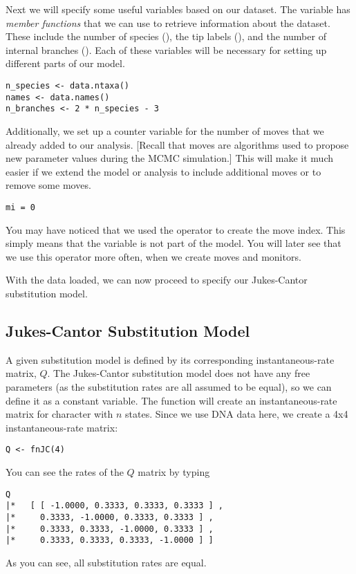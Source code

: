 Next we will specify some useful variables based on our dataset. The variable  has \textit{member functions} that we can use to retrieve information about the dataset. 
These include the number of species (), the tip labels (), and the number of internal branches ().
Each of these variables will be necessary for setting up different parts of our model.
{\tt \begin{snugshade*}
\begin{lstlisting}
n_species <- data.ntaxa()
names <- data.names()	
n_branches <- 2 * n_species - 3 
\end{lstlisting}
\end{snugshade*}}

Additionally, we set up a counter variable for the number of moves that we already added to our analysis.
[Recall that moves are algorithms used to propose new parameter values during the MCMC simulation.]
This will make it much easier if we extend the model or analysis to include additional moves or to remove some moves.
{\tt \begin{snugshade*}
\begin{lstlisting}
mi = 0 
\end{lstlisting}
\end{snugshade*}}
You may have noticed that we used the \cl{=} operator to create the move index.
This simply means that the variable is not part of the model.
You will later see that we use this operator more often, \EG when we create moves and monitors.

With the data loaded, we can now proceed to specify our Jukes-Cantor substitution model.

\subsection{Jukes-Cantor Substitution Model}

A given substitution model is defined by its corresponding instantaneous-rate matrix, $Q$.
The Jukes-Cantor substitution model does not have any free parameters (as the substitution rates are all assumed to be equal), so we can define it as a constant variable.
The function  will create an instantaneous-rate matrix for character with $n$ states.
Since we use DNA data here, we create a 4x4 instantaneous-rate matrix:
{\tt \begin{snugshade*}
\begin{lstlisting}
Q <- fnJC(4) 
\end{lstlisting}
\end{snugshade*}}
You can see the rates of the $Q$ matrix by typing
{\tt \begin{snugshade*}
\begin{lstlisting}
Q
|*   [ [ -1.0000, 0.3333, 0.3333, 0.3333 ] ,
|*     0.3333, -1.0000, 0.3333, 0.3333 ] ,
|*     0.3333, 0.3333, -1.0000, 0.3333 ] ,
|*     0.3333, 0.3333, 0.3333, -1.0000 ] ]
\end{lstlisting}
\end{snugshade*}}
As you can see, all substitution rates are equal.


